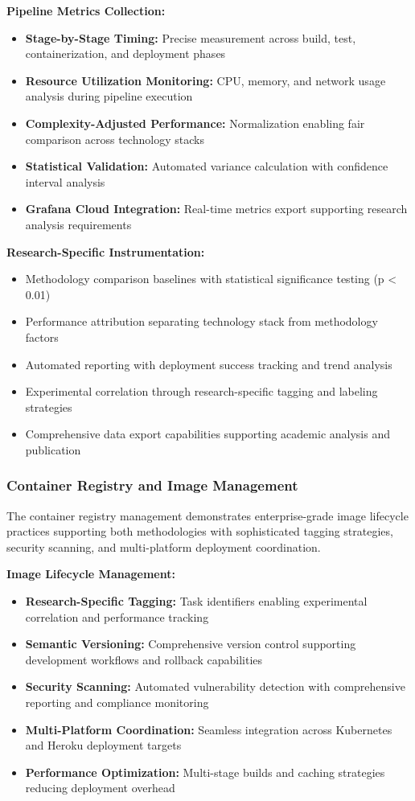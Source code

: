 \textbf{Pipeline Metrics Collection:}
\begin{itemize}
\item \textbf{Stage-by-Stage Timing:} Precise measurement across build, test, containerization, and deployment phases
\item \textbf{Resource Utilization Monitoring:} CPU, memory, and network usage analysis during pipeline execution
\item \textbf{Complexity-Adjusted Performance:} Normalization enabling fair comparison across technology stacks
\item \textbf{Statistical Validation:} Automated variance calculation with confidence interval analysis
\item \textbf{Grafana Cloud Integration:} Real-time metrics export supporting research analysis requirements
\end{itemize}

\textbf{Research-Specific Instrumentation:}
\begin{itemize}
\item Methodology comparison baselines with statistical significance testing (p < 0.01)
\item Performance attribution separating technology stack from methodology factors
\item Automated reporting with deployment success tracking and trend analysis
\item Experimental correlation through research-specific tagging and labeling strategies
\item Comprehensive data export capabilities supporting academic analysis and publication
\end{itemize}

\subsubsection{Container Registry and Image Management}

The container registry management demonstrates enterprise-grade image lifecycle practices supporting both methodologies with sophisticated tagging strategies, security scanning, and multi-platform deployment coordination.



\textbf{Image Lifecycle Management:}
\begin{itemize}
\item \textbf{Research-Specific Tagging:} Task identifiers enabling experimental correlation and performance tracking
\item \textbf{Semantic Versioning:} Comprehensive version control supporting development workflows and rollback capabilities
\item \textbf{Security Scanning:} Automated vulnerability detection with comprehensive reporting and compliance monitoring
\item \textbf{Multi-Platform Coordination:} Seamless integration across Kubernetes and Heroku deployment targets
\item \textbf{Performance Optimization:} Multi-stage builds and caching strategies reducing deployment overhead
\end{itemize}

